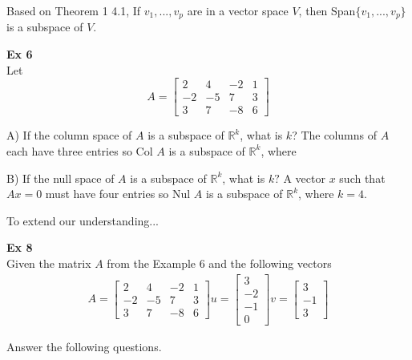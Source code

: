 \documentclass{article}
\begin{document}
   Based on Theorem 1 4.1, If $ v_1, ... , v_p $ are in a vector space $ V $, then Span$ \{ v_1,...,v_p \} $ is a subspace of $ V $. 

   \textbf{Ex 6}\\
   Let 
   \[
     A= \begin{bmatrix}
       2 &4 &-2 &1\\
       -2 &-5 &7 &3\\
       3 &7 &-8 &6
     \end{bmatrix}
   \]
   
   A) If the column space of $ A $ is a subspace of $ \mathbb{R}^{k} $, what is $ k $?
   The columns of $ A $ each have three entries so Col $ A $ is a subspace of $ \mathbb{R}^{k} $, where $  $   

   B) If the null space of $ A $ is a subspace of $ \mathbb{R}^{k} $, what is $ k? $ 
   A vector $ x $ such that $ Ax=0 $ must have four entries so Nul $ A $ is a subspace of $ \mathbb{R}^{k} $, where $ k=4 $.

   To extend our understanding...

   \textbf{Ex 8}\\
   Given the matrix $ A $ from the Example 6 and the following vectors
   \[
     \begin{gathered}
     A= \begin{bmatrix}
       2 &4 &-2 &1\\
       -2 &-5 &7 &3\\
       3 &7 &-8 &6
     \end{bmatrix}
     u = \begin{bmatrix}
       3\\
       -2\\
       -1\\
       0
     \end{bmatrix}
     v = \begin{bmatrix}
       3\\
       -1\\
       3
     \end{bmatrix}
     \end{gathered}
   \]

   Answer the following questions.
\end{document}
